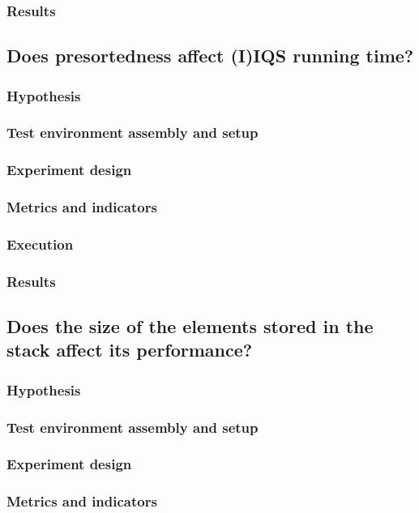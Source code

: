 \documentclass{iccmemoria}
\begin{document}
\subsubsection{Results}

\subsection{Does presortedness affect (I)IQS running time?}
\subsubsection{Hypothesis}
\subsubsection{Test environment assembly and setup}
\subsubsection{Experiment design}
\subsubsection{Metrics and indicators}
\subsubsection{Execution}
\subsubsection{Results}

\subsection{Does the size of the elements stored in the stack affect its performance?}
\subsubsection{Hypothesis}
\subsubsection{Test environment assembly and setup}
\subsubsection{Experiment design}
\subsubsection{Metrics and indicators}
\end{document}
